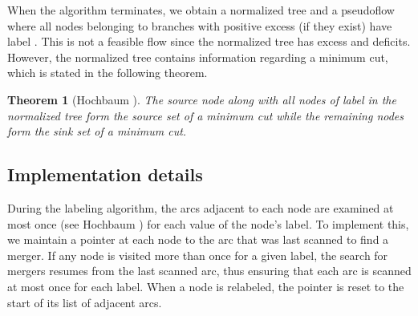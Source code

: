 \documentclass{article}
\newtheorem{theorem}{Theorem}[section]
\begin{document}
When the algorithm terminates, we obtain a normalized tree and a pseudoflow where all nodes belonging to branches with positive excess (if they exist) have label . This is not a feasible flow since the normalized tree has excess and deficits. However, the normalized tree contains information regarding a minimum cut, which is stated in the following theorem.

\begin{theorem}[Hochbaum \cite{Hoc97, Hoc07}]
The source node along with all nodes of label  in the normalized tree form the source set of a minimum cut while the remaining nodes form the sink set of a minimum cut.
\end{theorem}

\subsection{Implementation details}

 During the labeling algorithm, the arcs adjacent to each node are examined at most once (see Hochbaum \cite{Hoc97, Hoc07}) for each value of the node's label.  To implement this, we maintain a pointer at each node to the arc that was last scanned to find a merger. If any node is visited more than once for a given label, the search for mergers resumes from the last scanned arc, thus ensuring that each arc is scanned at most once for each label. When a node is relabeled, the pointer is reset to the start of its list of adjacent arcs.
\end{document}
